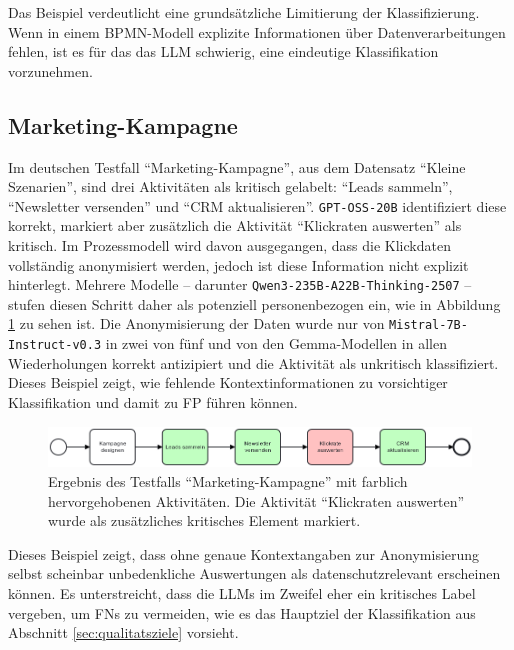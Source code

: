Das Beispiel verdeutlicht eine grundsätzliche Limitierung der Klassifizierung. Wenn in einem \ac{BPMN}-Modell explizite Informationen über Datenverarbeitungen fehlen, ist es für das das \ac{LLM} schwierig, eine eindeutige Klassifikation vorzunehmen.

\subsection*{Marketing-Kampagne}

Im deutschen Testfall \enquote{Marketing-Kampagne}, aus dem Datensatz \enquote{Kleine Szenarien}, sind drei Aktivitäten als kritisch gelabelt: \enquote{Leads sammeln}, \enquote{Newsletter versenden} und \enquote{CRM aktualisieren}. \texttt{GPT-OSS-20B} identifiziert diese korrekt, markiert aber zusätzlich die Aktivität \enquote{Klickraten auswerten} als kritisch. Im Prozessmodell wird davon ausgegangen, dass die Klickdaten vollständig anonymisiert werden, jedoch ist diese Information nicht explizit hinterlegt. Mehrere Modelle – darunter \texttt{Qwen3-235B-A22B-Thinking-2507} – stufen diesen Schritt daher als potenziell personenbezogen ein, wie in Abbildung \ref{fig:gptoss-fall} zu sehen ist. Die Anonymisierung der Daten wurde nur von \texttt{Mistral-7B-Instruct-v0.3} in zwei von fünf und von den Gemma-Modellen in allen Wiederholungen korrekt antizipiert und die Aktivität als unkritisch klassifiziert. Dieses Beispiel zeigt, wie fehlende Kontextinformationen zu vorsichtiger Klassifikation und damit zu \ac{FP} führen können.

\begin{figure}
    \centering
    \includegraphics[width=\textwidth]{images/results/examples/oss-20b-run-1-small-marketing}
    \caption{Ergebnis des Testfalls \enquote{Marketing-Kampagne} mit farblich hervorgehobenen Aktivitäten. Die Aktivität \enquote{Klickraten auswerten} wurde als zusätzliches kritisches Element markiert.}
    \label{fig:gptoss-fall}
\end{figure}

Dieses Beispiel zeigt, dass ohne genaue Kontextangaben zur Anonymisierung selbst scheinbar unbedenkliche Auswertungen als datenschutzrelevant erscheinen können. Es unterstreicht, dass die \acp{LLM} im Zweifel eher ein kritisches Label vergeben, um \acp{FN} zu vermeiden, wie es das Hauptziel der Klassifikation aus Abschnitt \ref{sec:qualitatsziele} vorsieht.

